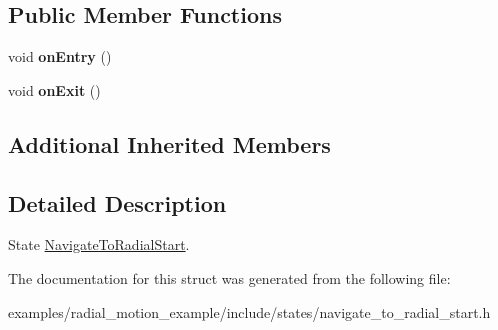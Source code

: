 \subsection*{Public Member Functions}
\begin{DoxyCompactItemize}
\item 
\mbox{\label{structNavigateToRadialStart_1_1NavigateToRadialStart_a99d667686b14a7703ddad496c9082d10}} 
void {\bfseries on\+Entry} ()
\item 
\mbox{\label{structNavigateToRadialStart_1_1NavigateToRadialStart_a6dbd559acd3df7fd07f660d75a9a487e}} 
void {\bfseries on\+Exit} ()
\end{DoxyCompactItemize}
\subsection*{Additional Inherited Members}


\subsection{Detailed Description}
State \hyperlink{structNavigateToRadialStart_1_1NavigateToRadialStart}{Navigate\+To\+Radial\+Start}. 

The documentation for this struct was generated from the following file\+:\begin{DoxyCompactItemize}
\item 
examples/radial\+\_\+motion\+\_\+example/include/states/navigate\+\_\+to\+\_\+radial\+\_\+start.\+h\end{DoxyCompactItemize}
